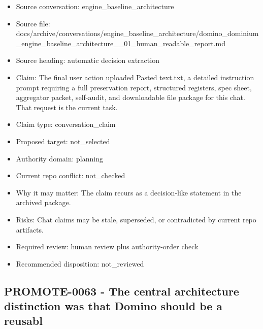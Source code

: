 \documentclass[11pt,a4paper]{report}
\begin{document}
\begin{itemize}
\item Source conversation: engine\_baseline\_architecture
\item Source file: docs/archive/conversations/engine\_baseline\_architecture/domino\_dominium\_engine\_baseline\_architecture\_\_01\_human\_readable\_report.md
\item Source heading: automatic decision extraction
\item Claim: The final user action uploaded Pasted text.txt, a detailed instruction prompt requiring a full preservation report, structured registers, spec sheet, aggregator packet, self-audit, and downloadable file package for this chat. That request is the current task.
\item Claim type: conversation\_claim
\item Proposed target: not\_selected
\item Authority domain: planning
\item Current repo conflict: not\_checked
\item Why it may matter: The claim recurs as a decision-like statement in the archived package.
\item Risks: Chat claims may be stale, superseded, or contradicted by current repo artifacts.
\item Required review: human review plus authority-order check
\item Recommended disposition: not\_reviewed
\end{itemize}

\subsection{PROMOTE-0063 - The central architecture distinction was that Domino should be a reusabl}
\end{document}
